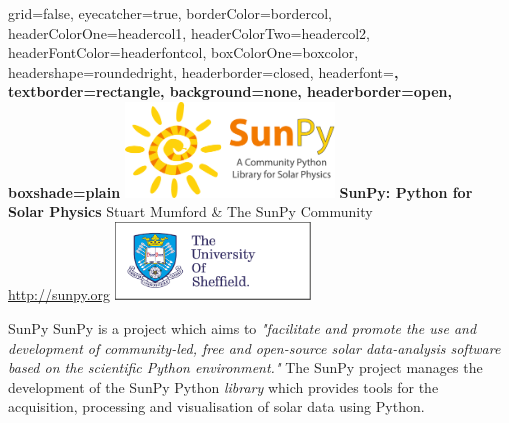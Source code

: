 \documentclass[a0paper,portrait]{baposter}
\begin{document}

\background{}

\begin{poster}{
	grid=false,
	eyecatcher=true, 
	borderColor=bordercol,
	headerColorOne=headercol1,
	headerColorTwo=headercol2,
	headerFontColor=headerfontcol,
	boxColorOne=boxcolor,
	headershape=roundedright,
	headerborder=closed,
	headerfont=\Large\sf\bf,
	textborder=rectangle,
	background=none,
	headerborder=open,
    boxshade=plain
}
{
	\includegraphics[width=15em]{sunpy_logo_long}
}
{\sf\bf
	SunPy: Python for Solar Physics
}
{
	\vspace{1em} Stuart Mumford \& The SunPy Community\\
	{\smaller \url{http://sunpy.org}}
}
{
	\includegraphics[width=14em]{TUOS_Logo_CMYK_Keyline}
}

\begin{posterbox}[name=sunpy,column=2,row=0]{SunPy}
SunPy is a project which aims to \textit{"facilitate and promote the use and development of community-led, free and open-source solar data-analysis software based on the scientific Python environment."}
The SunPy project manages the development of the SunPy Python \textit{library} which provides tools for the acquisition, processing and visualisation of solar data using Python.
\end{posterbox}


\end{poster}
\end{document}
